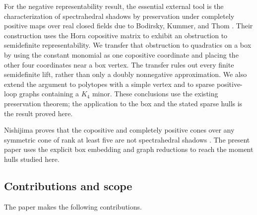 For the negative representability result, the essential external tool is
the characterization of spectrahedral shadows by preservation under
completely positive maps over real closed fields due to Bodirsky, Kummer,
and Thom \citep{BodirskyKummerThom2024}. Their construction uses the Horn
copositive matrix to exhibit an obstruction to semidefinite
representability. We transfer that obstruction to quadratics on a box by
using the constant monomial as one copositive coordinate and placing the
other four coordinates near a box vertex. The transfer rules out every
finite semidefinite lift, rather than only a doubly nonnegative
approximation. We also extend the argument to polytopes with a simple
vertex and to sparse positive-loop graphs containing a $K_4$ minor.
These conclusions use the existing preservation theorem; the application
to the box and the stated sparse hulls is the result proved here.

Nishijima proves that the copositive and completely positive cones over
any symmetric cone of rank at least five are not spectrahedral shadows
\citep[Theorem~3.2]{Nishijima2026}. The present paper uses the explicit
box embedding and graph reductions to reach the moment hulls studied here.

\subsection{Contributions and scope}

The paper makes the following contributions.

